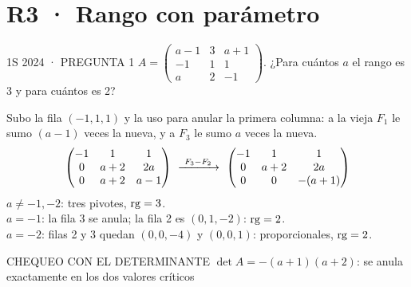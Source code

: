 \section*{R3 · Rango con parámetro}
\begin{enunciado}{1S 2024 · PREGUNTA 1}
$A=\begin{pmatrix}a-1&3&a+1\\-1&1&1\\a&2&-1\end{pmatrix}$. ¿Para cuántos $a$ el rango es 3 y para cuántos es 2?
\end{enunciado}
Subo la fila $(-1,1,1)$ y la uso para anular la primera columna: a la vieja $F_1$ le sumo $(a-1)$ veces la nueva, y a $F_3$ le sumo $a$ veces la nueva.
\[\begin{pmatrix}-1&1&1\\0&a+2&2a\\0&a+2&a-1\end{pmatrix}\ \xrightarrow{\ F_3-F_2\ }\ \begin{pmatrix}-1&1&1\\0&a+2&2a\\0&0&-(a+1)\end{pmatrix}\]
$a\neq-1,-2$: tres pivotes, $\operatorname{rg}=3$.\\
$a=-1$: la fila 3 se anula; la fila 2 es $(0,1,-2)$: $\operatorname{rg}=2$.\\
$a=-2$: filas 2 y 3 quedan $(0,0,-4)$ y $(0,0,1)$: proporcionales, $\operatorname{rg}=2$.
\begin{uso}{CHEQUEO CON EL DETERMINANTE}
$\det A=-(a+1)(a+2)$: se anula exactamente en los dos valores críticos\ok
\end{uso}

